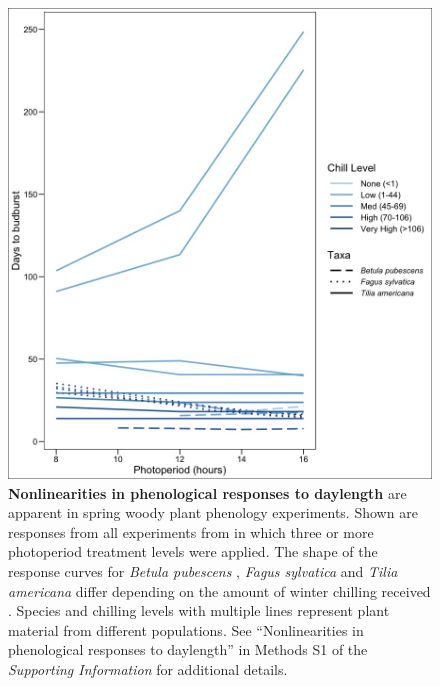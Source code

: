 \documentclass{article}
\begin{document}
\makeatletter
\renewcommand{\thefigure}{Box 1-\@arabic\c@figure}
\makeatother
\setcounter{figure}{0}
\begin{figure}[h]
\includegraphics{..//..//analyses/photoperiod/figures/Photo_curv_version2blue.jpeg} 
\caption{\textbf{ Nonlinearities in phenological responses to daylength} are apparent in spring woody plant phenology experiments. Shown are responses from all experiments  from \citet{wolkovich2019}in which three or more photoperiod treatment levels were applied. The shape of the response curves for \textit{Betula pubescens} \citep{Caffarra:2011b}, \textit{Fagus sylvatica} \citep{Heide:1993a} and \textit{Tilia americana} \citep{Ashby:1962aa} differ depending on the amount of winter chilling received \citep[measured in Chill portions,][with darker blue indicating more chilling]{fishman1987}. Species and chilling levels with multiple lines represent plant material from different populations. See ``Nonlinearities in phenological responses to daylength'' in Methods S1 of the \emph{Supporting Information} for additional details.}

\label{fig:photocurve}
\end{figure}
\end{document}
